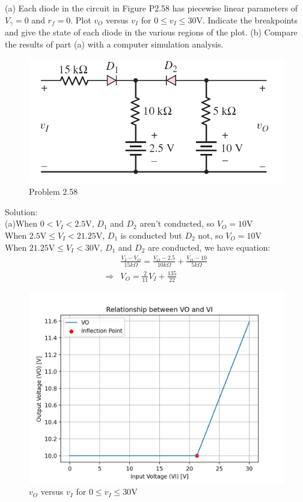 \documentclass[a4paper,11pt,UTF8]{article}
\begin{document}
 (a) Each diode in the circuit in Figure P2.58 has piecewise linear parameters
of $V_\gamma = 0 $ and $r_f = 0$. Plot $v_O$ versus $v_I$ for $0 \leq v_I \leq 30$V. Indicate the
breakpoints and give the state of each diode in the various regions of the plot.
(b) Compare the results of part (a) with a computer simulation analysis.
\begin{figure}[H] 
	\centering 
	\includegraphics[scale=0.35]{MD2.58.png}
	\caption{Problem 2.58}
\end{figure}
\noindent Solution:\\
(a)When $0<V_I<2.5$V, $D_1$ and $D_2$ aren't conducted, so $V_O=10$V\\
When $2.5$V$\leq V_I<21.25$V, $D_1$ is conducted but $D_2$ not, so $V_O=10$V\\
When $21.25$V$\leq V_I<30$V, $D_1$ and $D_2$ are conducted, we have equation:
$$\begin{aligned}
	&\frac{V_I-V_O}{15k\Omega}=\frac{V_O-2.5}{10k\Omega}+\frac{V_O-10}{5k\Omega}\\
	\Rightarrow &V_O=\frac{2}{11}V_I+\frac{135}{22}
\end{aligned}
$$
\begin{figure}[H] 
	\centering 
	\includegraphics[scale=0.25]{MD2.58_2}
	\caption{$v_O$ versus $v_I$ for $0 \leq v_I \leq 30$V}
\end{figure}
\end{document}
